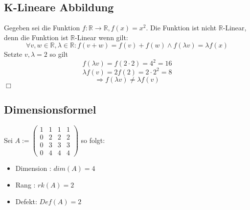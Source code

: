 \documentclass[12pt]{article}
\begin{document}
    \subsection{K-Lineare Abbildung}


    Gegeben sei die Funktion $f:\mathbb{R} \rightarrow \mathbb{R}, f(x) = x^2$. \newline
    \newline
    Die Funktion ist nicht $\mathbb{R}$-Linear, denn \newline
    die Funktion ist $\mathbb{R}$-Linear wenn gilt:
    \[\forall v,w\in \mathbb{R}, \lambda \in \mathbb{R} : f(v+w) = f(v) + f(w) \wedge f(\lambda v) = \lambda f(x)\]
    Setzte $v,\lambda=2$ so gilt \newline
    \[f(\lambda v) = f(2\cdot2)=4^2=16\]
    \[\lambda f(v) = 2 f(2)=2\cdot 2^2=8\]
    \[\Rightarrow f(\lambda v) \neq \lambda f(v)\]
    \hfill $\Box$

    \subsection{Dimensionsformel}

    Sei $A:=\begin{pmatrix}
                1& 1& 1& 1\\0& 2& 2& 2\\0& 3& 3& 3\\0& 4& 4& 4
    \end{pmatrix}$ so folgt: \newline


    \begin{itemize}
        \item Dimension : $dim(A) = 4$
        \item Rang : $rk(A) = 2$
        \item Defekt: $Def(A) = 2$
    \end{itemize}


    
\end{document}
